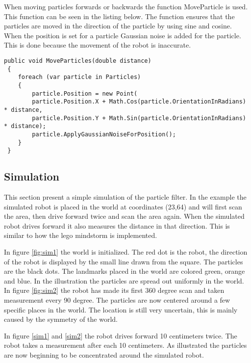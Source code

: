 When moving particles forwards or backwards the function MoveParticle is used. This function can be seen in the listing below. The function ensures that the particles are moved in the direction of the particle by using sine and cosine. When the position is set for a particle Gaussian noise is added for the particle. This is done because the movement of the robot is inaccurate. 

\lstset{style=sharpc}
\begin{lstlisting}[caption={Resampling wheel}, label=lst:wheel,  basicstyle=\tiny, mathescape=true]        
public void MoveParticles(double distance)
 {
 	foreach (var particle in Particles)
 	{
 		particle.Position = new Point(
 		particle.Position.X + Math.Cos(particle.OrientationInRadians) * distance, 
 		particle.Position.Y + Math.Sin(particle.OrientationInRadians) * distance); 
 		particle.ApplyGaussianNoiseForPosition();
 	}
 }
\end{lstlisting}

\subsection{Simulation}
This section present a simple simulation of the particle filter. In the example the simulated robot is placed in the world at coordinates (23,64) and will first scan the area, then drive forward twice and scan the area again. When the simulated robot drives forward it also measures the distance in that direction. This is similar to how the lego mindstorm is implemented.

In figure \ref{fig:sim1} the world is initialized. The red dot is the robot, the direction of the robot is displayed by the small line drawn from the square. The particles are the black dots. The landmarks placed in the world are colored green, orange and blue. In the illustration the particles are spread out uniformly in the world. In figure \ref{fig:sim2} the robot has made its first 360 degree scan and taken measurement every 90 degree. The particles are now centered around a few specific places in the world. The location is still very uncertain, this is mainly caused by the symmetry of the world.


In figure \ref{sim1} and \ref{sim2} the robot drives forward 10 centimeters twice. The robot takes a measurement after each 10 centimeters. As illustrated the particles are now beginning to be concentrated around the simulated robot.

